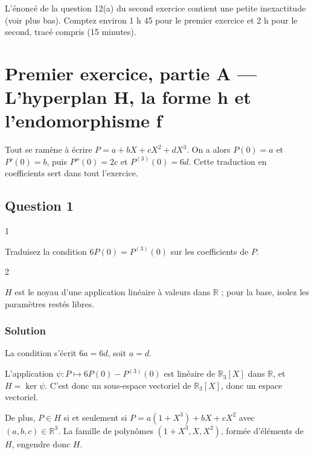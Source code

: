 \documentclass[11pt,a4paper]{article}
\begin{document}
L'énoncé de la question 12(a) du second exercice contient une petite inexactitude (voir plus bas). Comptez environ 1 h 45 pour le premier exercice et 2 h pour le second, tracé compris (15 minutes).

\hypertarget{premier-exercice-partie-a-lhyperplan-h-la-forme-h-et-lendomorphisme-f}{%
\section{Premier exercice, partie A --- L'hyperplan H, la forme h et l'endomorphisme f}\label{premier-exercice-partie-a-lhyperplan-h-la-forme-h-et-lendomorphisme-f}}

Tout se ramène à écrire \(P=a+bX+cX^2+dX^3\). On a alors \(P(0)=a\) et \(P'(0)=b\), puis \(P''(0)=2c\) et \(P^{(3)}(0)=6d\). Cette traduction en coefficients sert dans tout l'exercice.

\hypertarget{question-1}{%
\subsection{Question 1}\label{question-1}}

\begin{indication}{1}

Traduisez la condition \(6P(0)=P^{(3)}(0)\) sur les coefficients de \(P\).

\end{indication}

\begin{indication}{2}

\(H\) est le noyau d'une application linéaire à valeurs dans \(\mathbb{R}\) ; pour la base, isolez les paramètres restés libres.

\end{indication}

\hypertarget{solution}{%
\subsubsection{Solution}\label{solution}}

La condition s'écrit \(6a=6d\), soit \(a=d\).

L'application \(\psi:P\mapsto6P(0)-P^{(3)}(0)\) est linéaire de \({\mathbb{R}}_3[X]\) dans \(\mathbb{R}\), et \(H=\ker\psi\). C'est donc un sous-espace vectoriel de \({\mathbb{R}}_3[X]\), donc un espace vectoriel.

De plus, \(P\in H\) si et seulement si \(P=a(1+X^3)+bX+cX^2\) avec \((a,b,c)\in{\mathbb{R}}^3\). La famille de polynômes \((1+X^3,X,X^2)\), formée d'éléments de \(H\), engendre donc \(H\).
\end{document}
